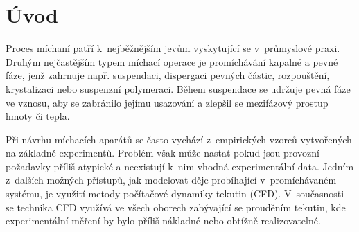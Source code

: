 \chapter{Úvod}
Proces míchaní patří k~nejběžnějším jevům vyskytující se v~průmyslové praxi. Druhým nejčastějším typem míchací operace je promíchávání kapalné a pevné fáze, jenž zahrnuje např. suspendaci, dispergaci pevných částic, rozpouštění, krystalizaci nebo suspenzní polymeraci. Během suspendace se udržuje pevná fáze ve vznosu, aby se zabránilo jejímu usazování a zlepšil se mezifázový prostup hmoty či tepla. 

Při návrhu míchacích aparátů se často vychází z~empirických vzorců vytvořených na základně experimentů. Problém však může nastat pokud jsou provozní požadavky příliš atypické a neexistují k~nim vhodná experimentální data. Jedním z~dalších možných přístupů, jak modelovat děje probíhající v~promíchávaném systému, je využití metody počítačové dynamiky tekutin (CFD). V~současnosti se technika CFD využívá ve všech oborech zabývající se prouděním tekutin, kde experimentální měření by bylo příliš nákladné nebo obtížně realizovatelné.   
